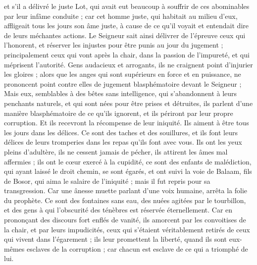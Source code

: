 \begin{multicols}{2}
et s'il a délivré le juste Lot{}, qui avait eut beaucoup à souffrir de ces abominables par leur infâme conduite ;
car cet homme juste, qui habitait au milieu d’eux, affligeait tous les jours son âme juste, à cause de ce qu’il voyait et entendait dire de leurs méchantes actions.
Le Seigneur sait ainsi délivrer de l’épreuve ceux qui l’honorent, et réserver les injustes pour être punis au jour du jugement ;
principalement ceux qui vont après la chair, dans la passion de l'impureté, et qui méprisent l’autorité. Gens audacieux et arrogants, ils ne craignent point d’injurier les gloires ;
alors que les anges qui sont supérieurs en force et en puissance, ne prononcent point contre elles de jugement blasphématoire devant le Seigneur ;
Mais eux, semblables à des bêtes sans intelligence, qui s’abandonnent à leurs penchants naturels, et qui sont nées pour être prises et détruites, ils parlent d’une manière blasphématoire de ce qu’ils ignorent, et ils périront par leur propre corruption.
Et ils recevront la récompense de leur iniquité. Ils aiment à être tous les jours dans les délices. Ce sont des taches et des souillures, et ils font leurs délices de leurs tromperies dans les repas qu'ils font avec vous.
Ils ont les yeux pleins d'adultère, ils ne cessent jamais de pécher, ils attirent les âmes mal affermies ; ils ont le cœur exercé à la cupidité, ce sont des enfants de malédiction,
qui ayant laissé le droit chemin, se sont égarés, et ont suivi la voie de Balaam{}, fils de Bosor, qui aima le salaire de l'iniquité ; mais il fut repris pour sa transgression.
Car une ânesse muette parlant d'une voix humaine, arrêta la folie du prophète.
Ce sont des fontaines sans eau, des nuées agitées par le tourbillon, et des gens à qui l'obscurité des ténèbres est réservée éternellement.
Car en prononçant des discours fort enflés de vanité, ils amorcent par les convoitises de la chair, et par leurs impudicités, ceux qui s'étaient véritablement retirés de ceux qui vivent dans l’égarement ;
ils leur promettent la liberté, quand ils sont eux-mêmes esclaves de la corruption ; car chacun est esclave de ce qui a triomphé de lui.

\end{multicols}
